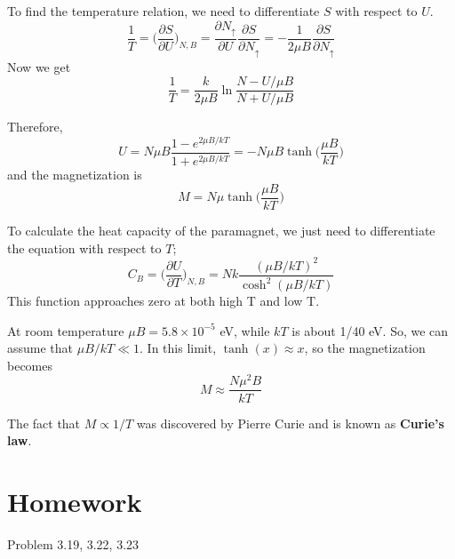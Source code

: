 To find the temperature relation, we need to differentiate $S$ with respect to $U$.
\begin{equation}
 \frac{1}{T} = \bigg(\frac{\partial S}{\partial U}\bigg)_{N, B} 
             = \frac{\partial N_\uparrow}{\partial U} \frac{\partial S}{\partial N_\uparrow} 
             = -\frac{1}{2\mu B}\frac{\partial S}{\partial N_\uparrow}    
\end{equation}
Now we get
\begin{equation}
    \frac{1}{T} = \frac{k}{2\mu B} \ln \frac{N-U/\mu B}{N+U/\mu B}
\end{equation}

Therefore, 
\begin{equation}
    U = N\mu B\frac{1-e^{2\mu B/kT}}{1+e^{2\mu B/kT}} = -N\mu B\tanh \bigg({\frac{\mu B}{kT}}\bigg)
\end{equation}
and the magnetization is
\begin{equation}
    M = N\mu\tanh \bigg({\frac{\mu B}{kT}}\bigg)
\end{equation}



To calculate the heat capacity of the paramagnet, we just need to differentiate the equation with respect to $T$;
\begin{equation}
    C_B = \bigg(\frac{\partial U}{\partial T}\bigg)_{N, B} = Nk \frac{(\mu B/kT)^2}{\cosh^2(\mu B/kT)}
\end{equation}
This function approaches zero at both high T and low T. 

At room temperature $\mu B = 5.8 \times 10^{-5}$ eV, while $kT$ is about 1/40 eV. So, we can assume that $\mu B/kT \ll 1$. In this limit, $\tanh(x) \approx x$, so the magnetization becomes 
\begin{equation}
    M \approx \frac{N\mu^2B}{kT}
\end{equation}

The fact that $M \propto 1/T$ was discovered by Pierre Curie and is known as \textbf{Curie's law}. 


\section{Homework}
Problem 3.19, 3.22, 3.23
